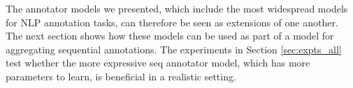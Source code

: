 The annotator models  we presented, which include the most widespread models for NLP annotation tasks, can therefore be seen as extensions of one another.
The next section shows how these models can be used as part of 
a model for aggregating sequential annotations. 
The experiments in Section \ref{sec:expts_all} 
 test whether the more expressive seq annotator model,
which has more parameters to learn, is beneficial in a realistic setting.
